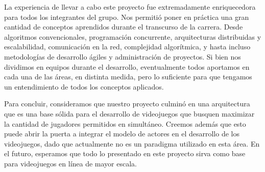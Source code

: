 La experiencia de llevar a cabo este proyecto fue extremadamente enriquecedora para todos los integrantes del grupo.
Nos permitió poner en práctica una gran cantidad de conceptos aprendidos durante el transcurso de la carrera. Desde algoritmos convencionales, programación concurrente, arquitecturas distribuidas y escalabilidad, comunicación en la red, complejidad algorítmica, y hasta incluso metodologías
de desarrollo ágiles y administración de proyectos. Si bien nos dividimos en equipos durante el desarrollo, eventualmente todos aportamos
en cada una de las áreas, en distinta medida, pero lo suficiente para que tengamos un entendimiento de todos los conceptos aplicados.

Para concluir, consideramos que nuestro proyecto culminó en una arquitectura que es una base sólida para el desarrollo de videojuegos
que busquen maximizar la cantidad de jugadores permitidos en simultáneo. Creemos además que esto puede abrir la puerta a integrar el modelo de actores en el desarrollo de los videojuegos,
dado que actualmente no es un paradigma utilizado en esta área. En el futuro, esperamos que todo lo presentado en este proyecto sirva como base para videojuegos en línea de mayor escala.
